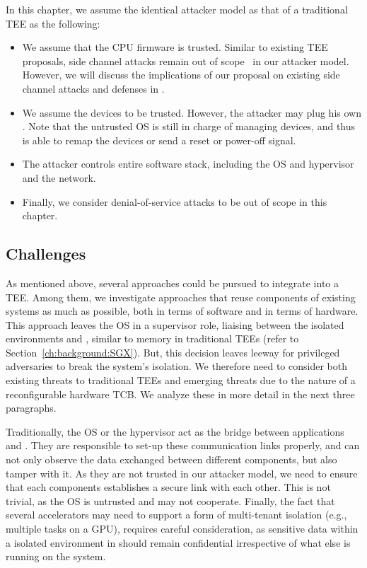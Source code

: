 In this chapter, we assume the identical attacker model as that of a traditional TEE as the following:

\begin{itemize}
  \item We assume that the CPU firmware is trusted. Similar to existing TEE proposals, side channel attacks remain out of scope~\cite{costan2016intel} in our attacker model. However, we will discuss the implications of our proposal on existing side channel attacks and defenses in . 
  
  \item We assume the \sphw devices to be trusted. However, the attacker may plug his own \sphw. Note that the untrusted OS is still in charge of managing \sphw devices, and thus is able to remap the devices or send a reset or power-off signal.
  
  \item  The attacker controls entire software stack, including the OS and hypervisor and the network.
   
  \item Finally, we consider denial-of-service attacks to be out of scope in this chapter. 
\end{itemize}



\subsection{Challenges}
\label{pue:sec:problemStatement:challenges}

As mentioned above, several approaches could be pursued to integrate \sphw into a TEE. Among them, we investigate approaches that reuse components of existing systems as much as possible, both in terms of software and in terms of hardware.  
This approach leaves the OS in a supervisor role, liaising between the isolated environments and \sphw, similar to memory in traditional TEEs (refer to  Section~\ref{ch:background:SGX}). But, this decision leaves leeway for privileged adversaries to break the system's isolation. We therefore need to consider both existing threats to traditional TEEs and emerging threats due to the nature of a reconfigurable hardware TCB. 
We analyze these in more detail in the next three paragraphs.


Traditionally, the OS or the hypervisor act as the bridge between applications and \sphw. They are responsible to set-up these communication links properly, and can not only observe the data exchanged between different components, but also tamper with it. As they are not trusted in our attacker model, we need to ensure that each components establishes a secure link with each other. This is not trivial, as the OS is untrusted and may not cooperate. 
Finally, the fact that several accelerators may need to support a form of multi-tenant isolation (e.g., multiple tasks on a GPU), requires careful consideration, as sensitive data within a isolated environment in \name should remain confidential irrespective of what else is running on the system.



